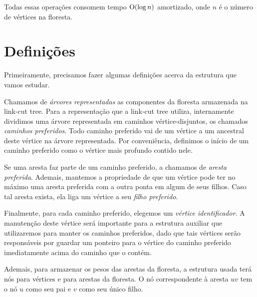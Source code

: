 Todas essas operações consomem tempo $\mathrm{O}(\log n)$ amortizado, onde $n$ é o número de vértices na floresta.

\section{Definições}
\label{sec:lct-definicoes}

Primeiramente, precisamos fazer algumas definições acerca da estrutura que vamos estudar.

Chamamos de \emph{árvores representadas} as componentes da floresta armazenada na link-cut tree. Para a representação que a link-cut tree utiliza, internamente dividimos uma árvore representada em caminhos vértice-disjuntos, os chamados \emph{caminhos preferidos}. Todo caminho preferido vai de um vértice a um ancestral deste vértice na árvore representada. Por conveniência, definimos o início de um caminho preferido como o vértice mais profundo contido nele.

Se uma aresta faz parte de um caminho preferido, a chamamos de \emph{aresta preferida}. Ademais, mantemos a propriedade de que um vértice pode ter no máximo uma aresta preferida com a outra ponta em algum de seus filhos. Caso tal aresta exista, ela liga um vértice a seu \emph{filho preferido}.

Finalmente, para cada caminho preferido, elegemos um \emph{vértice identificador}. A manutenção deste vértice será importante para a estrutura auxiliar que utilizaremos para manter os caminhos preferidos, dado que tais vértices serão responsáveis por guardar um ponteiro para o vértice do caminho preferido imediatamente acima do caminho que o contém.

Ademais, para armazenar os pesos das arestas da floresta, a estrutura usada terá nós para vértices e para arestas da floresta. O nó correspondente à aresta $uv$ tem o nó $u$ como seu pai e $v$ como seu único filho.


